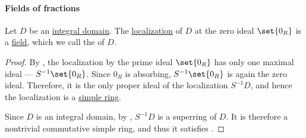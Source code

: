 \paragraph{Fields of fractions}

\begin{proposition}\label{thm:field_of_fractions}
  Let \( D \) be an \hyperref[def:integral_domain]{integral domain}. The \hyperref[def:ring_localization]{localization} of \( D \) at the zero ideal \( \set{ 0_R } \) is a \hyperref[def:field]{field}, which we call the  of \( D \).
\end{proposition}
\begin{proof}
  By , the localization by the prime ideal \( \set{ 0_R } \) has only one maximal ideal --- \( S^{-1} \set{ 0_R } \). Since \( 0_R \) is absorbing, \( S^{-1} \set{ 0_R } \) is again the zero ideal. Therefore, it is the only proper ideal of the localization \( S^{-1} D \), and hence the localization is a \hyperref[def:simple_object]{simple ring}.

  Since \( D \) is an integral domain, by , \( S^{-1} D \) is a superring of \( D \). It is therefore a nontrivial commutative simple ring, and thus it satisfies .
\end{proof}

